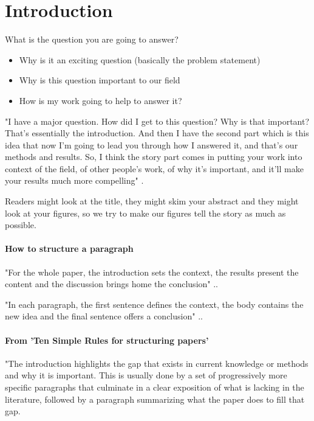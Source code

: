 \section*{Introduction}


What is the question you are going to answer?
\begin{itemize}
    \item Why is it an exciting question (basically the problem statement)
    \item Why is this question important to our field
    \item How is my work going to help to answer it?
\end{itemize}

"I have a major question. How did I get to this question? Why is that important? That’s essentially the introduction. And then I have the second part which is this idea that now I’m going to lead you through how I answered it, and that’s our methods and results. So, I think the story part comes in putting your work into context of the field, of other people’s work, of why it’s important, and it’ll make your results much more compelling" \cite{wilson2019ten}. 


Readers might look at the title, they might skim your abstract and they might look at your figures, so we try to make our figures tell the story as much as possible.


\paragraph{How to structure a paragraph}
"For the whole paper, the introduction sets the context, the results present the content and the discussion brings home the conclusion" \cite{wilson2019ten}..

"In each paragraph, the first sentence defines the context, the body contains the new idea and the final sentence offers a conclusion" \cite{wilson2019ten}..




\paragraph{From 'Ten Simple Rules for structuring papers'}
"The introduction highlights the gap that exists in current knowledge or methods and why it is important. This is usually done by a set of progressively more specific paragraphs that culminate in a clear exposition of what is lacking in the literature, followed by a paragraph summarizing what the paper does to fill that gap.

